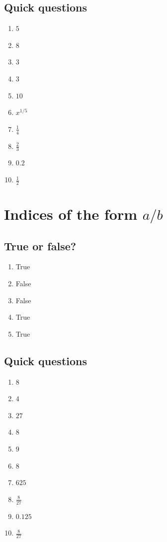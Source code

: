 \documentclass[11pt]{article}
\begin{document}
\subsection*{Quick questions}
\begin{enumerate}[label=\arabic*.]
\item \(5\)
\item \(8\)
\item \(3\)
\item \(3\)
\item \(10\)
\item \(x^{1/5}\)
\item \(\frac{1}{4}\)
\item \(\frac{2}{3}\)
\item \(0.2\)
\item \(\frac{1}{2}\)
\end{enumerate}

\section{Indices of the form \(a/b\)}

\subsection*{True or false?}
\begin{enumerate}[label=\arabic*.]
\item True
\item False
\item False
\item True
\item True
\end{enumerate}

\subsection*{Quick questions}
\begin{enumerate}[label=\arabic*.]
\item \(8\)
\item \(4\)
\item \(27\)
\item \(8\)
\item \(9\)
\item \(8\)
\item \(625\)
\item \(\frac{8}{27}\)
\item \(0.125\)
\item \(\frac{8}{27}\)
\end{enumerate}
\end{document}
